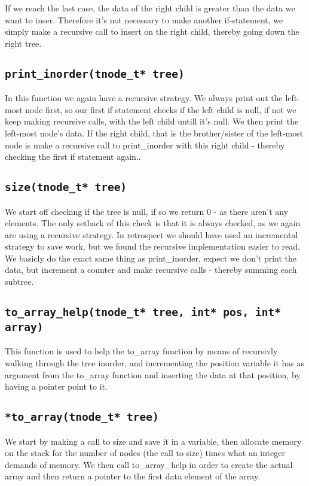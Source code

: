 \documentclass[11pt,a4paper]{article}
\begin{document}
If we reach the last case, the data of the right child is greater than the data
we want to inser. Therefore it's not necessary to make another if-statement, we
simply make a recursive call to insert on the right child, thereby going down
the right tree.

\subsection{\texttt{print\_inorder(tnode\_t* tree)}}
In this function we again have a recursive strategy. We always print out the
left-most node first, so our first if statement checks if the left child is
null, if not we keep making recursive calls, with the left child untill it's
null. We then print the left-most node's data. If the right child, that is the
brother/sister of the left-most node is make a recursive call to print\_inorder
with this right child - thereby checking the first if statement again..

\subsection{\texttt{size(tnode\_t* tree)}}
We start off checking if the tree is null, if so we return 0 - as there aren't
any elements. The only setback of this check is that it is always checked, as
we again are using a recursive strategy. In retrospect we should have used an
incremental strategy to save work, but we found the recursive implementation
easier to read. We basicly do the exact same thing as print\_inorder, expect we
don't print the data, but increment a counter and make recursive calls -
thereby summing each subtree.

\subsection{\texttt{to\_array\_help(tnode\_t* tree, int* pos, int* array)}}
This function is used to help the to\_array function by means of recursivly
walking through the tree inorder, and incrementing the position variable it has
as argument from the to\_array function and inserting the data at that
position, by having a pointer point to it.

\subsection{\texttt{*to\_array(tnode\_t* tree)}}
We start by making a call to size and save it in a variable, then allocate
memory on the stack for the number of nodes (the call to size) times what an
integer demands of memory. We then call to\_array\_help in order to create the
actual array and then return a pointer to the first data element of the array.
\end{document}
